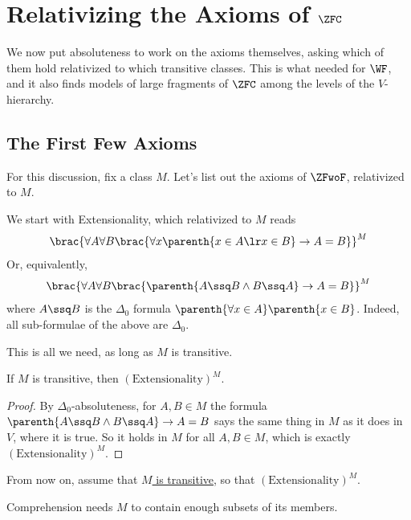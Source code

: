\section{Relativizing the Axioms of $\ZFC$}

We now put absoluteness to work on the axioms themselves, asking which of them hold relativized to which transitive classes. This is what  needed for $\WF$, and it also finds models of large fragments of $\ZFC$ among the levels of the $V$-hierarchy.

\subsection{The First Few Axioms}

For this discussion, fix a class $M$. Let's list out the axioms of $\ZFwoF$, relativized to $M$.

We start with Extensionality, which relativized to $M$ reads
\begin{align*}
    \brac{\forall A \forall B \brac{\forall x \parenth{x \in A \lr x \in B} \to A = B}}^M
\end{align*}
Or, equivalently,
\begin{align*}
    \brac{\forall A \forall B \brac{\parenth{A \ssq B \land B \ssq A} \to A = B}}^M
\end{align*}
where $A \ssq B$ is the $\Delta_0$ formula $\parenth{\forall x \in A}\parenth{x \in B}$. Indeed, all sub-formulae of the above are $\Delta_0$.

This is all we need, as long as $M$ is transitive.

\begin{boxlemma}[Extensionality]
    If $M$ is transitive, then $(\text{Extensionality})^M$.
\end{boxlemma}
\begin{proof}
    By $\Delta_0$-absoluteness, for $A, B \in M$ the formula $\parenth{A \ssq B \land B \ssq A} \to A = B$ says the same thing in $M$ as it does in $V$, where it is true. So it holds in $M$ for all $A, B \in M$, which is exactly $(\text{Extensionality})^M$.
\end{proof}

From now on, assume that \underline{$M$ is transitive}, so that $(\text{Extensionality})^M$.

Comprehension needs $M$ to contain enough subsets of its members.

